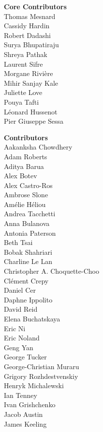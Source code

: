 \documentclass[11pt, a4paper, logo, twocolumn, copyright, nonumbering]{googledeepmind}
\begin{document}
\noindent\textbf{Core Contributors} \\
Thomas Mesnard \\
Cassidy Hardin \\
Robert Dadashi \\
Surya Bhupatiraju \\
Shreya Pathak \\
Laurent Sifre \\
Morgane Rivière \\
Mihir Sanjay Kale \\
Juliette Love \\
Pouya Tafti \\
Léonard Hussenot \\
Pier Giuseppe Sessa

\noindent\textbf{Contributors} \\
Aakanksha Chowdhery \\
Adam Roberts \\
Aditya Barua \\
Alex Botev \\
Alex Castro-Ros \\
Ambrose Slone \\
Amélie Héliou \\
Andrea Tacchetti \\
Anna Bulanova \\
Antonia Paterson \\
Beth Tsai \\
Bobak Shahriari \\
Charline Le Lan \\
Christopher A. Choquette-Choo \\
Clément Crepy \\
Daniel Cer \\
Daphne Ippolito \\
David Reid \\
Elena Buchatskaya \\
Eric Ni \\
Eric Noland \\
Geng Yan \\
George Tucker  \\
George-Christian Muraru \\
Grigory Rozhdestvenskiy \\
Henryk Michalewski \\
Ian Tenney \\
Ivan Grishchenko \\
Jacob Austin \\
James Keeling \\
\end{document}
